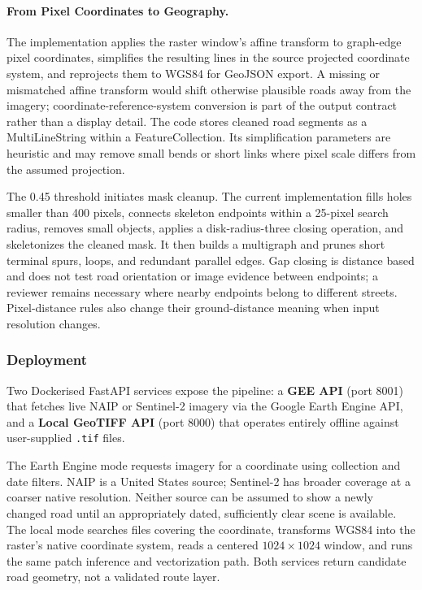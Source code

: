 \documentclass[10pt,a4paper,twocolumn]{article}
\begin{document}
\paragraph{From Pixel Coordinates to Geography.}
The implementation applies the raster window's affine transform to graph-edge pixel coordinates, simplifies the resulting lines in the source projected coordinate system, and reprojects them to WGS84 for GeoJSON export. A missing or mismatched affine transform would shift otherwise plausible roads away from the imagery; coordinate-reference-system conversion is part of the output contract rather than a display detail. The code stores cleaned road segments as a MultiLineString within a FeatureCollection. Its simplification parameters are heuristic and may remove small bends or short links where pixel scale differs from the assumed projection.

The 0.45 threshold initiates mask cleanup. The current implementation fills holes smaller than 400 pixels, connects skeleton endpoints within a 25-pixel search radius, removes small objects, applies a disk-radius-three closing operation, and skeletonizes the cleaned mask. It then builds a multigraph and prunes short terminal spurs, loops, and redundant parallel edges. Gap closing is distance based and does not test road orientation or image evidence between endpoints; a reviewer remains necessary where nearby endpoints belong to different streets. Pixel-distance rules also change their ground-distance meaning when input resolution changes.

\subsubsection{Deployment}

Two Dockerised FastAPI services expose the pipeline: a \textbf{GEE
API} (port 8001) that fetches live NAIP or Sentinel-2 imagery via the
Google Earth Engine API, and a \textbf{Local GeoTIFF API} (port 8000)
that operates entirely offline against user-supplied \texttt{.tif}
files.

The Earth Engine mode requests imagery for a coordinate using collection and date filters. NAIP is a United States source; Sentinel-2 has broader coverage at a coarser native resolution. Neither source can be assumed to show a newly changed road until an appropriately dated, sufficiently clear scene is available. The local mode searches files covering the coordinate, transforms WGS84 into the raster's native coordinate system, reads a centered $1024\times1024$ window, and runs the same patch inference and vectorization path. Both services return candidate road geometry, not a validated route layer.
\end{document}
